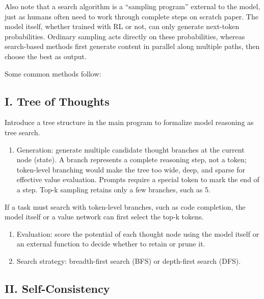 Also note that a search algorithm is a ``sampling program'' external to the model, just as humans often need to work through complete steps on scratch paper. The model itself, whether trained with RL or not, can only generate next-token probabilities. Ordinary sampling acts directly on these probabilities, whereas search-based methods first generate content in parallel along multiple paths, then choose the best as output.

Some common methods follow:

\hypertarget{i.-tree-of-thoughts}{%
\subsection{I. Tree of Thoughts}\label{i.-tree-of-thoughts}}

Introduce a tree structure in the main program to formalize model reasoning as tree search.

\begin{enumerate}
\def\labelenumi{\arabic{enumi}.}
\tightlist
\item
  Generation: generate multiple candidate thought branches at the current node (state). A branch represents a complete reasoning step, not a token; token-level branching would make the tree too wide, deep, and sparse for effective value evaluation. Prompts require a special token to mark the end of a step. Top-k sampling retains only a few branches, such as 5.
\end{enumerate}

If a task must search with token-level branches, such as code completion, the model itself or a value network can first select the top-k tokens.

\begin{enumerate}
\def\labelenumi{\arabic{enumi}.}
\setcounter{enumi}{1}
\item
  Evaluation: score the potential of each thought node using the model itself or an external function to decide whether to retain or prune it.
\item
  Search strategy: breadth-first search (BFS) or depth-first search (DFS).
\end{enumerate}

\hypertarget{ii.-self-consistency}{%
\subsection{II. Self-Consistency}\label{ii.-self-consistency}}

